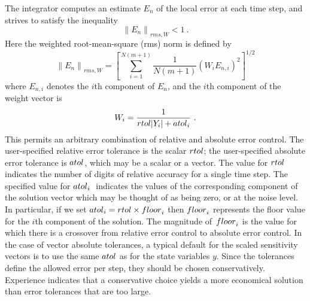 The integrator computes an estimate $E_{n}$ of the local error at each
time step, and strives to satisfy the inequality
\begin{equation}
\left\| E_n\right\|_{rms,W} < 1 ~.  \label{Err}
\end{equation}
Here the weighted root-mean-square (rms) norm is defined by
\begin{equation}
\left\| E_n\right\|_{rms,W}=\left[\sum_{i=1}^{N(m+1)}\frac{1}{N(m+1)}
\left(W_i E_{n,i}\right) ^2\right] ^{1/2}  \label{rms}
\end{equation}
where $E_{n,i}$ denotes the $i$th component of $E_n$, and the $i$th 
component of the weight vector is 
\begin{equation}
W_i=\frac{1}{{\sc rtol} |Y_i|+{\sc atol}_i} ~.  \label{weight}
\end{equation}
This permits an arbitrary combination of relative and absolute error control.
The user-specified relative error tolerance is the scalar ${\sc rtol}$; the
user-specified absolute error tolerance is ${\sc atol}$, which may be a
scalar or a vector.
The value for ${\sc rtol}$ indicates the number of digits of relative
accuracy for a single time step.
The specified value for ${\sc atol}_{i}\;$ indicates the values of the
corresponding component of the solution vector which may be thought of
as being zero, or at the noise level.
In particular, if we set ${\sc atol}_i={\sc rtol} \times {\sc floor}_i$ then
${\sc floor}_i$ represents the floor value for the $i$th component of the
solution.
The magnitude of~${\sc floor}_i$ is the value for which there is a 
crossover from relative error control to absolute error control.
In the case of vector absolute tolerances, a typical default for the
scaled sensitivity vectors is to use the same ${\sc atol}$ as for the state
variables $y$.
Since the tolerances define the allowed error per step, they should
be chosen conservatively.
Experience indicates that a conservative choice yields a more
economical solution than error tolerances that are too large.

